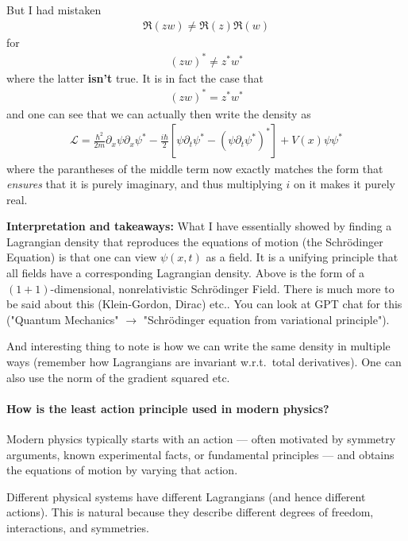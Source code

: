 But I had mistaken \begin{align*}
    \Re(zw) \neq \Re (z)\Re (w)
\end{align*}
for \begin{align*}
    (zw)^{\ast} \neq z^{\ast} w^{\ast} 
\end{align*}
where the latter \textbf{isn't} true. It is in fact the case that \begin{align*}
    (zw)^{\ast} = z^{\ast} w^{\ast} 
\end{align*} 
and one can see that we can actually then write the density as \begin{align*}
    \mathcal{L} = \frac{\hbar^{2} }{2m}\partial _x \psi \partial _x \psi ^{\ast} - \frac{i\hbar}{2}\left[ \psi \partial _t \psi ^{\ast} - \left( \psi \partial _t \psi ^{\ast} \right)^{\ast} \right] + V(x) \psi \psi ^{\ast} 
\end{align*}
where the parantheses of the middle term now exactly matches the form that \textit{ensures} that it is purely imaginary, and thus multiplying \(i\) on it makes it purely real. 

\textbf{Interpretation and takeaways:} What I have essentially showed by finding a Lagrangian density that reproduces the equations of motion (the Schrödinger Equation) is that one can view \(\psi (x, t)\) as a field. It is a unifying principle that all fields have a corresponding Lagrangian density. Above is the form of a \((1 + 1)\)-dimensional, nonrelativistic Schrödinger Field. There is much more to be said about this (Klein-Gordon, Dirac) etc.. You can look at GPT chat for this ("Quantum Mechanics" \(\to \)  "Schrödinger equation from variational principle").

And interesting thing to note is how we can write the same density in multiple ways (remember how Lagrangians are invariant w.r.t.\ total derivatives). One can also use the norm of the gradient squared etc.

\paragraph{How is the least action principle used in modern physics?}
Modern physics typically starts with an action — often motivated by symmetry arguments, known experimental facts, or fundamental principles — and obtains the equations of motion by varying that action.

Different physical systems have different Lagrangians (and hence different actions). This is natural because they describe different degrees of freedom, interactions, and symmetries.

